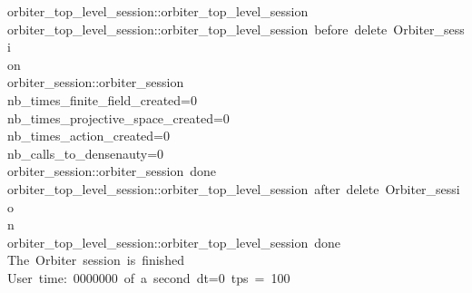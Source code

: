 \begin{tabbing}
orbiter\_top\_level\_session::orbiter\_top\_level\_session\\[0pt]
orbiter\_top\_level\_session::orbiter\_top\_level\_session\ before\ delete\ Orbiter\_sessi\\[0pt]
on\\[0pt]
orbiter\_session::orbiter\_session\\[0pt]
nb\_times\_finite\_field\_created=0\\[0pt]
nb\_times\_projective\_space\_created=0\\[0pt]
nb\_times\_action\_created=0\\[0pt]
nb\_calls\_to\_densenauty=0\\[0pt]
orbiter\_session::orbiter\_session\ done\\[0pt]
orbiter\_top\_level\_session::orbiter\_top\_level\_session\ after\ delete\ Orbiter\_sessio\\[0pt]
n\\[0pt]
orbiter\_top\_level\_session::orbiter\_top\_level\_session\ done\\[0pt]
The\ Orbiter\ session\ is\ finished\\[0pt]
User\ time:\ 0000000\ of\ a\ second\ dt=0\ tps\ =\ 100\\[0pt]
\end{tabbing}
